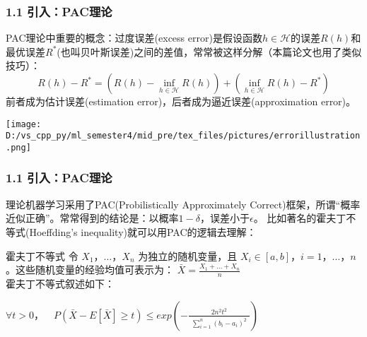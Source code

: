 \documentclass{beamer}
\begin{document}
\begin{frame}
    \frametitle{1.1 引入：PAC理论}
    PAC理论中重要的概念：过度误差(excess error)是假设函数$h\in\mathcal{H}$的误差$R(h)$和最优误差$R^{*}$(也叫贝叶斯误差)之间的差值，常常被这样分解（本篇论文也用了类似技巧）：
    \begin{equation*}
        R(h)-R^{*}=(R(h)-\inf_{h \in \mathcal{H}} R(h))+(\inf_{h \in \mathcal{H}} R(h)-R^{*})
    \end{equation*}
    前者成为估计误差(estimation error)，后者成为逼近误差(approximation error)。
    \begin{center} %
        \texttt{[image: D:/vs\_cpp\_py/ml\_semester4/mid\_pre/tex\_files/pictures/errorillustration.png]}
    \end{center}

\end{frame}


\begin{frame}
    \frametitle{1.1 引入：PAC理论}
理论机器学习采用了PAC(Probilistically Approximately Correct)框架，所谓“概率近似正确”。常常得到的结论是：以概率$1-\delta$，误差小于$\epsilon$。
比如著名的霍夫丁不等式(Hoeffding's inequality)就可以用PAC的逻辑去理解：\\
\begin{exampleblock}{霍夫丁不等式}
    令 $X_1，\dots，X_n$ 为独立的随机变量，且 $X_i\in[a,b] ， i=1，\dots，n $。这些随机变量的经验均值可表示为：
    $\bar{X}=\frac{X_1+\dots+X_n}{n}$\\
    
    霍夫丁不等式叙述如下：
    
    $\forall{t>0}，\quad P(\bar{X}-E[\bar{X}]\ge t)\le exp(-\frac{2n^2t^2}{\begin{matrix} \sum_{i=1}^n (b_i-a_i)^2 \end{matrix}})$
\end{exampleblock}
\end{frame}
\end{document}
